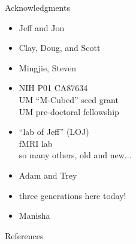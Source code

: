 \documentclass{beamer}
\begin{document}
\begin{frame}{Acknowledgments}
	\begin{itemize}[label{}]
		\item<2>{ Jeff and Jon}
		\item<3>{ Clay, Doug, and Scott}
		\item<4>{ Mingjie, Steven}
		\item<5>{%
			 NIH P01 CA87634 \\
			\makebox[3cm][l]{} UM ``M-Cubed'' seed grant \\
			\makebox[3cm][l]{} UM pre-doctoral fellowship
		}%
		\item<6>{%
			 ``lab of Jeff'' (LOJ) \\
			\makebox[3cm][l]{} fMRI lab \\
			\makebox[3cm][l]{} so many others, old and new...
		}%
		\item<7>{ Adam and Trey}
		\item<8>{ three generations here today!}
		\item<9>{ Manisha}
	\end{itemize}
\end{frame}

\begin{frame}[allowframebreaks]{References}
\end{frame}


\end{document}
